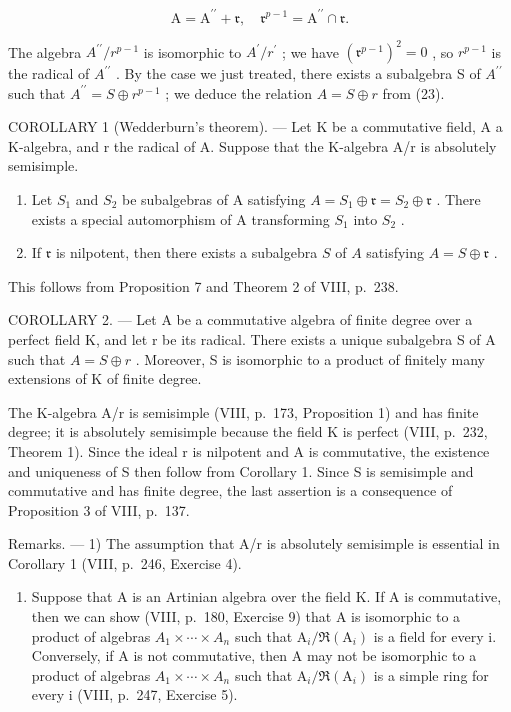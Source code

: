 \[
\mathrm{A} = \mathrm{A} ^ {\prime \prime} + \mathfrak {r}, \quad \mathfrak {r} ^ {p - 1} = \mathrm{A} ^ {\prime \prime} \cap \mathfrak {r}.\tag{23}
\]

The algebra \(A^{\prime\prime}/r^{p-1}\) is isomorphic to \(A^{\prime}/r^{\prime}\) ; we have \((\mathfrak{r}^{p-1})^{2}=0\) , so \(r^{p-1}\) is the radical of \(A^{\prime\prime}\) . By the case we just treated, there exists a subalgebra S of \(A^{\prime\prime}\) such that \(A^{\prime\prime}=S\oplus r^{p-1}\) ; we deduce the relation \(A=S\oplus r\) from (23).

COROLLARY 1 (Wedderburn's theorem). --- Let K be a commutative field, A a K-algebra, and r the radical of A. Suppose that the K-algebra A/r is absolutely semisimple.

\begin{enumerate}
\def\labelenumi{\alph{enumi})}
\item
  Let \(S_1\) and \(S_2\) be subalgebras of A satisfying \(A = S_1 \oplus \mathfrak{r} = S_2 \oplus \mathfrak{r}\) . There exists a special automorphism of A transforming \(S_1\) into \(S_2\) .
\item
  If \(\mathfrak{r}\) is nilpotent, then there exists a subalgebra \(S\) of \(A\) satisfying \(A = S \oplus \mathfrak{r}\) .
\end{enumerate}

This follows from Proposition 7 and Theorem 2 of VIII, p.~238.

COROLLARY 2. --- Let A be a commutative algebra of finite degree over a perfect field K, and let r be its radical. There exists a unique subalgebra S of A such that \(A = S \oplus r\) . Moreover, S is isomorphic to a product of finitely many extensions of K of finite degree.

The K-algebra A/r is semisimple (VIII, p.~173, Proposition 1) and has finite degree; it is absolutely semisimple because the field K is perfect (VIII, p.~232, Theorem 1). Since the ideal r is nilpotent and A is commutative, the existence and uniqueness of S then follow from Corollary 1. Since S is semisimple and commutative and has finite degree, the last assertion is a consequence of Proposition 3 of VIII, p.~137.

Remarks. --- 1) The assumption that A/r is absolutely semisimple is essential in Corollary 1 (VIII, p.~246, Exercise 4).

\begin{enumerate}
\def\labelenumi{\arabic{enumi})}
\setcounter{enumi}{1}
\tightlist
\item
  Suppose that A is an Artinian algebra over the field K. If A is commutative, then we can show (VIII, p.~180, Exercise 9) that A is isomorphic to a product of algebras \(A_{1} \times \cdots \times A_{n}\) such that \(\mathrm{A}_{i}/\Re(\mathrm{A}_{i})\) is a field for every i. Conversely, if A is not commutative, then A may not be isomorphic to a product of algebras \(A_{1} \times \cdots \times A_{n}\) such that \(\mathrm{A}_{i}/\Re(\mathrm{A}_{i})\) is a simple ring for every i (VIII, p.~247, Exercise 5).
\end{enumerate}

